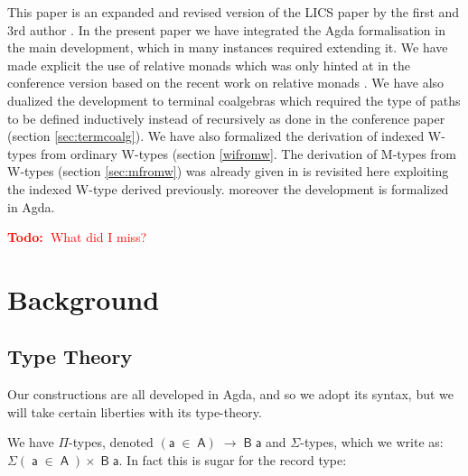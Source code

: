 \documentclass[a4paper]{article}
\makeatletter
\newcommand{\todo}[1]{\textcolor{red}{\textbf{Todo:~}#1}}
\newcommand{\Conid}[1]{\mathit{#1}}
\newcommand{\Varid}[1]{\mathit{#1}}
\newcommand{\anonymous}{\kern0.06em \vbox{\hrule\@width.5em}}
\def\resethooks{%
  \global\let\SaveRestoreHook\empty
  \global\let\ColumnHook\empty}
\newcommand{\hsindent}[1]{\quad}%
\let\hspre\empty
\let\hspost\empty
\renewcommand\Varid[1]{\mathord{\textsf{#1}}}
\let\Conid\Varid
\newcommand\Keyword[1]{\textsf{\textbf{#1}}}
\makeatother
\begin{document}
This paper is an expanded and revised version of the LICS paper by the
first and 3rd author \cite{alti:lics09}. In the present paper we have
integrated the Agda formalisation in the main development, which in
many instances required extending it. We have made explicit the use of
relative monads which was only hinted at in the conference version
based on the recent work on relative monads \cite{alti:fossacs10}. We have
also dualized the development to terminal coalgebras which required
the type of paths to be defined inductively instead of recursively as
done in the conference paper (section \ref{sec:termcoalg}).  We
have also formalized the derivation of indexed W-types from ordinary
W-types (section \ref{wifromw}. The derivation of M-types from W-types
(section \ref{sec:mfromw})
was already given in \cite{alti:cont-tcs} is revisited here exploiting the
indexed W-type derived previously. moreover the development is formalized in
Agda. 

\todo{What did I miss?}


\section{Background}
\label{sec:background}

 

\subsection{Type Theory}

\newcommand{\prodd}{\ensuremath{\mathaccent\cdot{\prod}}}





Our constructions are all developed in Agda, and so we adopt its syntax, but we will take certain liberties with its type-theory. 

We have $\Pi$-types, denoted \ensuremath{(\Varid{a}\;\in\;\Conid{A})\;\rightarrow\;\Conid{B}\;\Varid{a}} and $\Sigma$-types, which we write as: \ensuremath{\Sigma(\!\;\Varid{a}\;\in\;\Conid{A}\;\!)\!\times\!\;\Conid{B}\;\Varid{a}}. In fact this is sugar for the record type:

\resethooks
\end{document}
